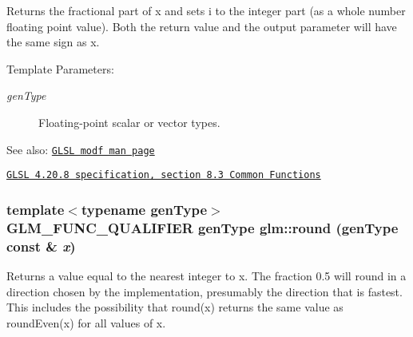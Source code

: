 Returns the fractional part of x and sets i to the integer part (as a whole number floating point value). Both the return value and the output parameter will have the same sign as x.

\begin{Desc}
\item[Template Parameters:]
\begin{description}
\item[{\em genType}]Floating-point scalar or vector types.\end{description}
\end{Desc}
\begin{Desc}
\item[See also:]\href{http://www.opengl.org/sdk/docs/manglsl/xhtml/modf.xml}{\tt GLSL modf man page} 

\href{http://www.opengl.org/registry/doc/GLSLangSpec.4.20.8.pdf}{\tt GLSL 4.20.8 specification, section 8.3 Common Functions} \end{Desc}
\hypertarget{group__core__func__common_g931fae510be1b98fe22646fc649a50d2}{
\subsubsection[round]{\setlength{\rightskip}{0pt plus 5cm}template$<$typename genType$>$ GLM\_\-FUNC\_\-QUALIFIER genType glm::round (genType const \& {\em x})}}
\label{group__core__func__common_g931fae510be1b98fe22646fc649a50d2}


Returns a value equal to the nearest integer to x. The fraction 0.5 will round in a direction chosen by the implementation, presumably the direction that is fastest. This includes the possibility that round(x) returns the same value as roundEven(x) for all values of x.

